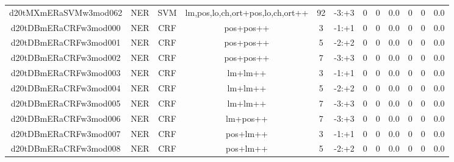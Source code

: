 \documentclass[a4paper]{article}
\begin{document}
\begin{landscape}
\begin{center}
\begin{tabular}{ |c|c|c|c|c|c|c|c|c|c|c|c|}
 
 	
 	\small{ d20tMXmERaSVMw3mod062 } & \small{ NER} & \small{  SVM }  & lm,pos,lo,ch,ort+pos,lo,ch,ort++  &  92 &  \small{  -3:+3 }  &  0 & 0 & 0.0  &  0 & 0 & 0.0 \\
 	

 
 	
 	\small{ d20tDBmERaCRFw3mod000 } & \small{ NER} & \small{  CRF }  & pos+pos++  &  3 &  \small{  -1:+1 }  &  0 & 0 & 0.0  &  0 & 0 & 0.0 \\
 	

 
 	
 	\small{ d20tDBmERaCRFw3mod001 } & \small{ NER} & \small{  CRF }  & pos+pos++  &  5 &  \small{  -2:+2 }  &  0 & 0 & 0.0  &  0 & 0 & 0.0 \\
 	

 
 	
 	\small{ d20tDBmERaCRFw3mod002 } & \small{ NER} & \small{  CRF }  & pos+pos++  &  7 &  \small{  -3:+3 }  &  0 & 0 & 0.0  &  0 & 0 & 0.0 \\
 	

 
 	
 	\small{ d20tDBmERaCRFw3mod003 } & \small{ NER} & \small{  CRF }  & lm+lm++  &  3 &  \small{  -1:+1 }  &  0 & 0 & 0.0  &  0 & 0 & 0.0 \\
 	

 
 	
 	\small{ d20tDBmERaCRFw3mod004 } & \small{ NER} & \small{  CRF }  & lm+lm++  &  5 &  \small{  -2:+2 }  &  0 & 0 & 0.0  &  0 & 0 & 0.0 \\
 	

 
 	
 	\small{ d20tDBmERaCRFw3mod005 } & \small{ NER} & \small{  CRF }  & lm+lm++  &  7 &  \small{  -3:+3 }  &  0 & 0 & 0.0  &  0 & 0 & 0.0 \\
 	

 
 	
 	\small{ d20tDBmERaCRFw3mod006 } & \small{ NER} & \small{  CRF }  & lm+pos++  &  7 &  \small{  -3:+3 }  &  0 & 0 & 0.0  &  0 & 0 & 0.0 \\
 	

 
 	
 	\small{ d20tDBmERaCRFw3mod007 } & \small{ NER} & \small{  CRF }  & pos+lm++  &  3 &  \small{  -1:+1 }  &  0 & 0 & 0.0  &  0 & 0 & 0.0 \\
 	

 
 	
 	\small{ d20tDBmERaCRFw3mod008 } & \small{ NER} & \small{  CRF }  & pos+lm++  &  5 &  \small{  -2:+2 }  &  0 & 0 & 0.0  &  0 & 0 & 0.0 \\
 	


\end{tabular}
\end{center}
\end{landscape}
\end{document}
